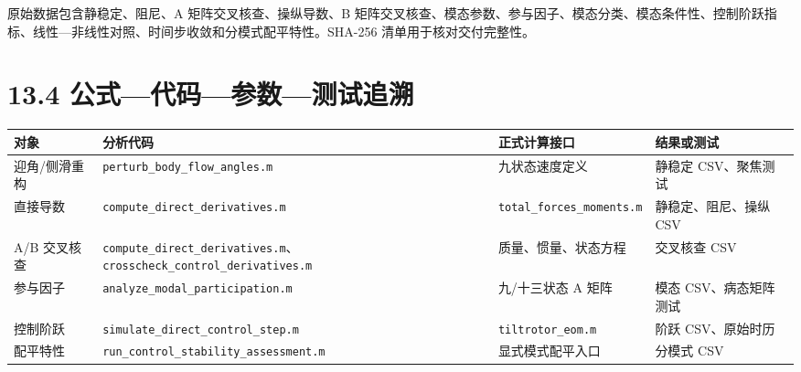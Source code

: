 \documentclass[UTF8,11pt,oneside,openany,fontset=windows]{ctexbook}
\begin{document}
原始数据包含静稳定、阻尼、A 矩阵交叉核查、操纵导数、B
矩阵交叉核查、模态参数、参与因子、模态分类、模态条件性、控制阶跃指标、线性---非线性对照、时间步收敛和分模式配平特性。SHA-256
清单用于核对交付完整性。

\section{13.4
公式---代码---参数---测试追溯}\label{ux516cux5f0fux4ee3ux7801ux53c2ux6570ux6d4bux8bd5ux8ffdux6eaf}

\begin{longtable}[]{@{}
  >{\raggedright\arraybackslash}p{}
  >{\raggedright\arraybackslash}p{}
  >{\raggedright\arraybackslash}p{}
  >{\raggedright\arraybackslash}p{}@{}}
\toprule\noalign{}
\begin{minipage}[b]{\linewidth}\raggedright
对象
\end{minipage} & \begin{minipage}[b]{\linewidth}\raggedright
分析代码
\end{minipage} & \begin{minipage}[b]{\linewidth}\raggedright
正式计算接口
\end{minipage} & \begin{minipage}[b]{\linewidth}\raggedright
结果或测试
\end{minipage} \\
\midrule\noalign{}
\endhead
\bottomrule\noalign{}
\endlastfoot
迎角/侧滑重构 & \texttt{perturb\_body\_flow\_angles.m} & 九状态速度定义
& 静稳定 CSV、聚焦测试 \\
直接导数 & \texttt{compute\_direct\_derivatives.m} &
\texttt{total\_forces\_moments.m} & 静稳定、阻尼、操纵 CSV \\
A/B 交叉核查 &
\texttt{compute\_direct\_derivatives.m}、\texttt{crosscheck\_control\_derivatives.m}
& 质量、惯量、状态方程 & 交叉核查 CSV \\
参与因子 & \texttt{analyze\_modal\_participation.m} & 九/十三状态 A 矩阵
& 模态 CSV、病态矩阵测试 \\
控制阶跃 & \texttt{simulate\_direct\_control\_step.m} &
\texttt{tiltrotor\_eom.m} & 阶跃 CSV、原始时历 \\
配平特性 & \texttt{run\_control\_stability\_assessment.m} &
显式模式配平入口 & 分模式 CSV \\
\end{longtable}
\end{document}
